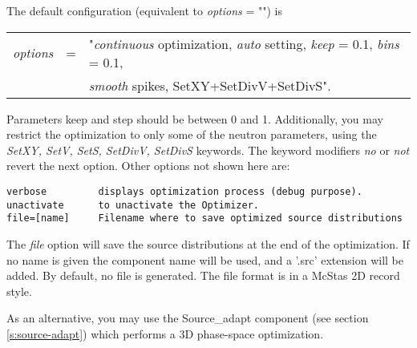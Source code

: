 The default configuration (equivalent to \textit{options} = "") is
\begin{center}
\begin{tabular}{rcl}
  \textit{options} & = & "\textit{continuous} optimization,
  \textit{auto} setting, \textit{keep} = 0.1, \textit{bins} = 0.1, \\
  & & \textit{smooth} spikes, SetXY+SetDivV+SetDivS".
\end{tabular}
\end{center}
Parameters keep and step should be between 0 and 1.
Additionally, you may restrict the optimization to only some of the neutron parameters, using the \textit{SetXY, SetV, SetS, SetDivV, SetDivS} keywords.
The keyword modifiers \textit{no} or \textit{not} revert the next option.
Other options not shown here are:
\begin{lstlisting}
verbose         displays optimization process (debug purpose).
unactivate      to unactivate the Optimizer.
file=[name]     Filename where to save optimized source distributions
\end{lstlisting}
The \textit{file} option will save the source distributions at the end of
the optimization. If no name is given the component name will be used,
and a '.src' extension will be added. By default, no file is generated.
The file format is in a McStas 2D record style.

As an alternative, you may use the Source\_adapt component
(see section \ref{s:source-adapt}) which performs
a 3D phase-space optimization.
